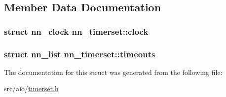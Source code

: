 \subsection{Member Data Documentation}
\subsubsection[{clock}]{\setlength{\rightskip}{0pt plus 5cm}struct {\bf nn\+\_\+clock} nn\+\_\+timerset\+::clock}\hypertarget{structnn__timerset_a5a3914bf199f9cf0091f3700cb94ea94}{}\label{structnn__timerset_a5a3914bf199f9cf0091f3700cb94ea94}
\subsubsection[{timeouts}]{\setlength{\rightskip}{0pt plus 5cm}struct {\bf nn\+\_\+list} nn\+\_\+timerset\+::timeouts}\hypertarget{structnn__timerset_a7f956cb83b02643f85f83754b0a7ce41}{}\label{structnn__timerset_a7f956cb83b02643f85f83754b0a7ce41}


The documentation for this struct was generated from the following file\+:\begin{DoxyCompactItemize}
\item 
src/aio/\hyperlink{timerset_8h}{timerset.\+h}\end{DoxyCompactItemize}
